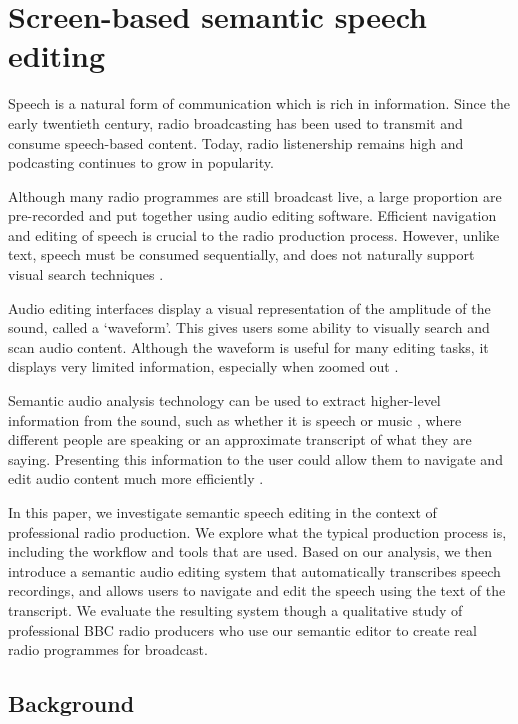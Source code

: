 \chapter{Screen-based semantic speech editing}\label{chp:screen}

Speech is a natural form of communication which is rich in information. Since the early twentieth century, radio
broadcasting has been used to transmit and consume speech-based content. Today, radio listenership remains high and
podcasting continues to grow in popularity. 

Although many radio programmes are still broadcast live, a large proportion are pre-recorded and put together using
audio editing software. Efficient navigation and editing of speech is crucial to the radio production process.
However, unlike text, speech must be consumed sequentially, and does not naturally support visual search techniques
\citep{Wolfe2004}. 

Audio editing interfaces display a visual representation of the amplitude of the sound, called a `waveform'. This gives
users some ability to visually search and scan audio content. Although the waveform is useful for many editing tasks,
it displays very limited information, especially when zoomed out \citep{Loviscach2011}.

Semantic audio analysis technology can be used to extract higher-level information from the sound, such as whether it
is speech or music \citep{Panagiotakis2005}, where different people are speaking \citep{AngueraMiro2012} or an
approximate transcript of what they are saying.  Presenting this information to the user could allow them to navigate
and edit audio content much more efficiently \citep{Whittaker2004}.

In this paper, we investigate semantic speech editing in the context of professional radio production. We explore what
the typical production process is, including the workflow and tools that are used. Based on our analysis, we then
introduce a semantic audio editing system that automatically transcribes speech recordings, and allows users to
navigate and edit the speech using the text of the transcript.  We evaluate the resulting system though a qualitative
study of professional BBC radio producers who use our semantic editor to create real radio programmes for broadcast.


\section{Background}\label{sec:screen-background}

